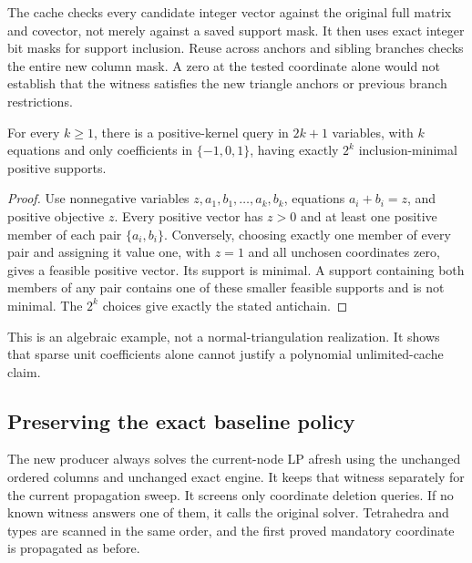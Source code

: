 The cache checks every candidate integer vector against the original full
matrix and covector, not merely against a saved support mask. It then uses
exact integer bit masks for support inclusion. Reuse across anchors and
sibling branches checks the entire new column mask. A zero at the tested
coordinate alone would not establish that the witness satisfies the new
triangle anchors or previous branch restrictions.

\begin{proposition}
\label{prop:exponential-antichain}
For every $k\ge1$, there is a positive-kernel query in $2k+1$ variables,
with $k$ equations and only coefficients in $\{-1,0,1\}$, having exactly
$2^k$ inclusion-minimal positive supports.
\end{proposition}
\begin{proof}
Use nonnegative variables $z,a_1,b_1,\ldots,a_k,b_k$, equations
$a_i+b_i=z$, and positive objective $z$. Every positive vector has $z>0$
and at least one positive member of each pair $\{a_i,b_i\}$. Conversely,
choosing exactly one member of every pair and assigning it value one,
with $z=1$ and all unchosen coordinates zero, gives a feasible positive
vector. Its support is minimal. A support containing both members of any
pair contains one of these smaller feasible supports and is not minimal.
The $2^k$ choices give exactly the stated antichain.
\end{proof}

This is an algebraic example, not a normal-triangulation realization. It
shows that sparse unit coefficients alone cannot justify a polynomial
unlimited-cache claim.

\subsection{Preserving the exact baseline policy}

The new producer always solves the current-node LP afresh using the
unchanged ordered columns and unchanged exact engine. It keeps that witness
separately for the current propagation sweep. It screens only coordinate
deletion queries. If no known witness answers one of them, it calls the
original solver. Tetrahedra and types are scanned in the same order, and
the first proved mandatory coordinate is propagated as before.

